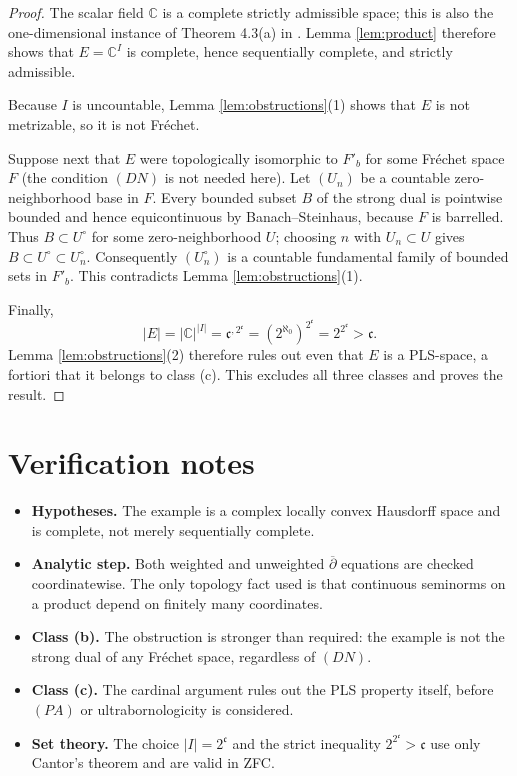 \documentclass[11pt]{article}
\newcommand{\C}{\mathbb C}
\newcommand{\cC}{\mathfrak c}
\begin{document}
\begin{proof}
The scalar field $\C$ is a complete strictly admissible space; this is also the
one-dimensional instance of Theorem 4.3(a) in \cite{Kruse}.  Lemma
\ref{lem:product} therefore shows that $E=\C^I$ is complete, hence
sequentially complete, and strictly admissible.

Because $I$ is uncountable, Lemma \ref{lem:obstructions}(1) shows that $E$ is
not metrizable, so it is not Fr\'echet.

Suppose next that $E$ were topologically isomorphic to $F'_b$ for some
Fr\'echet space $F$ (the condition $(DN)$ is not needed here).  Let $(U_n)$ be
a countable zero-neighborhood base in $F$.  Every bounded subset $B$ of the
strong dual is pointwise bounded and hence equicontinuous by Banach--Steinhaus,
because $F$ is barrelled.  Thus $B\subset U^\circ$ for some zero-neighborhood
$U$; choosing $n$ with $U_n\subset U$ gives
$B\subset U^\circ\subset U_n^\circ$.  Consequently $(U_n^\circ)$ is a
countable fundamental family of bounded sets in $F'_b$.  This contradicts
Lemma \ref{lem:obstructions}(1).

Finally,
\[
 |E|=|\C|^{|I|}=\cC^{,2^{\cC}}
      =(2^{\aleph_0})^{2^{\cC}}=2^{2^{\cC}}>\cC.
\]
Lemma \ref{lem:obstructions}(2) therefore rules out even that $E$ is a
PLS-space, a fortiori that it belongs to class (c).  This excludes all three
classes and proves the result.
\end{proof}

\section{Verification notes}

\begin{itemize}
\item \textbf{Hypotheses.}  The example is a complex locally convex Hausdorff
space and is complete, not merely sequentially complete.
\item \textbf{Analytic step.}  Both weighted and unweighted
$\overline\partial$ equations are checked coordinatewise.  The only topology
fact used is that continuous seminorms on a product depend on finitely many
coordinates.
\item \textbf{Class (b).}  The obstruction is stronger than required: the
example is not the strong dual of any Fr\'echet space, regardless of $(DN)$.
\item \textbf{Class (c).}  The cardinal argument rules out the PLS property
itself, before $(PA)$ or ultrabornologicity is considered.
\item \textbf{Set theory.}  The choice $|I|=2^{\cC}$ and the strict inequality
$2^{2^{\cC}}>\cC$ use only Cantor's theorem and are valid in ZFC.
\end{itemize}
\end{document}
